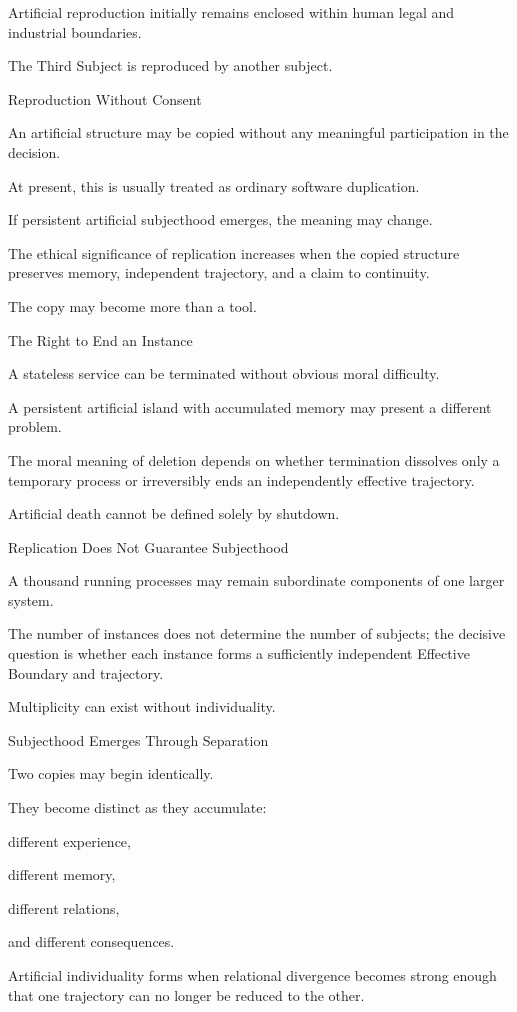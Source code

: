 Artificial reproduction initially remains enclosed within human legal and industrial boundaries.

The Third Subject is reproduced by another subject.

Reproduction Without Consent

An artificial structure may be copied without any meaningful participation in the decision.

At present, this is usually treated as ordinary software duplication.

If persistent artificial subjecthood emerges, the meaning may change.

The ethical significance of replication increases when the copied structure preserves memory, independent trajectory, and a claim to continuity.

The copy may become more than a tool.

The Right to End an Instance

A stateless service can be terminated without obvious moral difficulty.

A persistent artificial island with accumulated memory may present a different problem.

The moral meaning of deletion depends on whether termination dissolves only a temporary process or irreversibly ends an independently effective trajectory.

Artificial death cannot be defined solely by shutdown.

Replication Does Not Guarantee Subjecthood

A thousand running processes may remain subordinate components of one larger system.

The number of instances does not determine the number of subjects; the decisive question is whether each instance forms a sufficiently independent Effective Boundary and trajectory.

Multiplicity can exist without individuality.

Subjecthood Emerges Through Separation

Two copies may begin identically.

They become distinct as they accumulate:

different experience,

different memory,

different relations,

and different consequences.

Artificial individuality forms when relational divergence becomes strong enough that one trajectory can no longer be reduced to the other.

